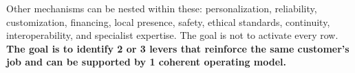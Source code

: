 Other mechanisms can be nested within these: personalization, reliability, customization, financing, local presence, safety, ethical standards, continuity, interoperability, and specialist expertise. The goal is not to activate every row. \textbf{The goal is to identify 2 or 3 levers that reinforce the same customer's job and can be supported by 1 coherent operating model.}
